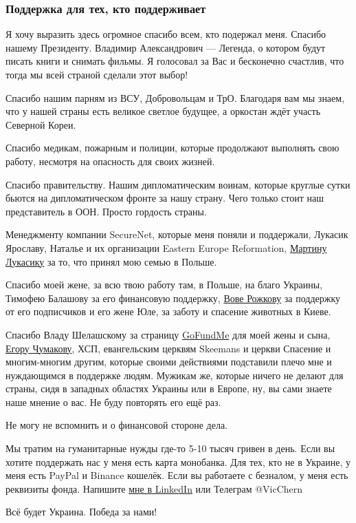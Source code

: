  
 
 
 
 

\subsubsection{Поддержка для тех, кто поддерживает}
\label{sec:29_03_2022.stz.pc.ua.dou.1.kapellan.4.podderzhka}

Я хочу выразить здесь огромное спасибо всем, кто подержал меня. Спасибо нашему
Президенту. Владимир Александрович — Легенда, о котором будут писать книги и
снимать фильмы. Я голосовал за Вас и бесконечно счастлив, что тогда мы всей
страной сделали этот выбор!

Спасибо нашим парням из ВСУ, Добровольцам и ТрО. Благодаря вам мы знаем, что у
нашей страны есть великое светлое будущее, а оркостан ждёт участь Северной
Кореи.

Спасибо медикам, пожарным и полиции, которые продолжают выполнять свою работу,
несмотря на опасность для своих жизней.

Спасибо правительству. Нашим дипломатическим воинам, которые круглые сутки
бьются на дипломатическом фронте за нашу страну. Чего только стоит наш
представитель в ООН. Просто гордость страны.

Менеджменту компании SecureNet, которые меня поняли и поддержали, Лукасик
Ярославу, Наталье и их организации Eastern Europe Reformation, \href{https://www.linkedin.com/in/mlukasik-dev/}{Мартину Лукасику}
за то, что принял мою семью в Польше.

Спасибо моей жене, за всю твою работу там, в Польше, на благо Украины, Тимофею
Балашову за его финансовую поддержку,
\href{https://www.linkedin.com/in/rozhok/}{Вове Рожкову} за поддержку от его
подписчиков и его жене Юле, за заботу и спасение животных в Киеве.

Спасибо Владу Шелашскому за страницу
\href{https://gofund.me/d1b741ea}{GoFundMe} для моей жены и сына,
\href{https://www.linkedin.com/in/yegor-chumakov-8a9304125/}{Егору Чумакову},
ХСП, евангельским церквям Skeemans и церкви Спасение и многим-многим другим,
которые своими действиями подставили плечо мне и нуждающимся в поддержке людям.
Мужикам же, которые ничего не делают для страны, сидя в западных областях
Украины или в Европе, ну, вы сами знаете наше мнение о вас.  Не буду повторять
его ещё раз.

Не могу не вспомнить и о финансовой стороне дела.

Мы тратим на гуманитарные нужды где-то 5-10 тысяч гривен в день. Если вы хотите
поддержать нас у меня есть карта монобанка. Для тех, кто не в Украине, у меня
есть PayPal и Binance кошелёк. Если вы работаете с безналом, у меня есть
реквизиты фонда. Напишите \href{https://www.linkedin.com/in/vicchern/}{мне в
LinkedIn} или Телеграм @VicChern

Всё будет Украина. Победа за нами!
